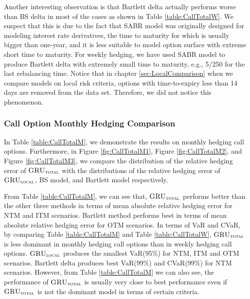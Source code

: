 \documentclass[letterpaper,12pt,titlepage,oneside,final]{book}
\numberwithin{equation}{section}
\theoremstyle{definition}
\newcommand{\modelT}{\textsc{GRU}_{\textsc{total}}}
\newcommand{\modelL}{\textsc{GRU}_{\textsc{local}}}
\begin{document}
Another interesting observation is that Bartlett delta actually performs worse than BS delta in most of the cases as shown in Table \ref{table:CallTotalW}. We suspect that this is due to the fact that SABR model was originally designed for modeling interest rate derivatives, the time to maturity for which is usually bigger than one-year, and it is less suitable to model option surface with extreme short time to maturity\cite{chen2011calibration}. For weekly hedging, we have used SABR model to produce Bartlett delta with extremely small time to maturity, e.g., 5/250 for the last rebalancing time.
Notice that in chapter \ref{sec:LocalComparison} when we compare models on local risk criteria, options with time-to-expiry less than 14 days are removed from the data set. Therefore, we did not notice this phenomenon.

\subsubsection{Call Option Monthly Hedging Comparison}
In Table \ref{table:CallTotalM}, we demonstrate the results on monthly hedging call options. Furthermore, in Figure \ref{fig:CallTotalM1}, Figure \ref{fig:CallTotalM2}, and  Figure \ref{fig:CallTotalM3}, we compare the distribution of the relative hedging error of $\modelT$ with the distributions of the relative hedging error of $\modelL$, BS model, and Bartlett model respectively.

From Table \ref{table:CallTotalM}, we can see that, $\modelT$ performs better than the other three methods in terms of 
mean absolute relative hedging error for NTM and ITM scenarios. Bartlett method performs best in terms of 
mean absolute relative hedging error for OTM scenarios. In terms of VaR and CVaR, by comparing Table \ref{table:CallTotalM} and Table \ref{table:CallTotalW}, $\modelT$ is less dominant  in monthly hedging call options than in weekly hedging call options. $\modelL$ produces the smallest VaR(95\%) for NTM, ITM and OTM scenarios. Bartlett delta produces best VaR(99\%) and CVaR(99\%) for NTM scenarios. However, from Table \ref{table:CallTotalM} we can also see, the performance of $\modelT$ is usually very close to best performance even if  $\modelT$ is not the dominant model in terms of certain criteria.
\end{document}
